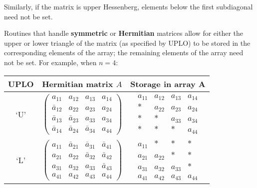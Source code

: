 Similarly, if the matrix is upper Hessenberg, elements below the
first subdiagonal need not be set.

Routines that handle {\bf symmetric} 
or {\bf Hermitian} matrices
allow for either the upper or lower triangle of the matrix 
(as specified by UPLO) to
be stored in the corresponding elements of the array; the remaining
elements of the array need not be set.
For example, when $n = 4$:

\begin{center}
\begin{tabular}{|c|c|c|} \hline
UPLO & Hermitian matrix $A$ & Storage in array A \\ \hline
`U' &
$
\left( \begin{array}{cccc}
a_{11}       & a_{12}       & a_{13}       & a_{14} \\
\bar{a}_{12} & a_{22}       & a_{23}       & a_{24} \\
\bar{a}_{13} & \bar{a}_{23} & a_{33}       & a_{34} \\
\bar{a}_{14} & \bar{a}_{24} & \bar{a}_{34} & a_{44}
\end{array} \right)
$
&
$
\begin{array}{cccc}
a_{11} & a_{12} & a_{13} & a_{14} \\
 \ast  & a_{22} & a_{23} & a_{24} \\
 \ast  &  \ast  & a_{33} & a_{34} \\
 \ast  &  \ast  &  \ast  & a_{44}
\end{array}
$
\\ \hline
`L' &
$
\left( \begin{array}{cccc}
a_{11} & \bar{a}_{21} & \bar{a}_{31} & \bar{a}_{41} \\
a_{21} & a_{22}       & \bar{a}_{32} & \bar{a}_{42} \\
a_{31} & a_{32}       & a_{33}       & \bar{a}_{43} \\
a_{41} & a_{42}       & a_{43}       & a_{44}
\end{array} \right)
$
&
$
\begin{array}{cccc}
a_{11} &  \ast  &  \ast  &  \ast  \\
a_{21} & a_{22} &  \ast  &  \ast  \\
a_{31} & a_{32} & a_{33} &  \ast  \\
a_{41} & a_{42} & a_{43} & a_{44}
\end{array}
$ 
\\ \hline
\end{tabular}
\end{center}

